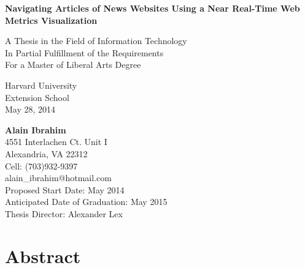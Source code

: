\documentclass[12pt]{article}
\begin{document}
\begin{titlepage}
    \begin{center}
        \vspace*{0.5cm}
        
        \begin{doublespace}        
        \textbf{\Large Navigating Articles of News Websites Using a Near Real-Time Web Metrics Visualization}
        \vfill


        A Thesis in the Field of Information Technology \\
        In Partial Fulfillment of the Requirements \\
        For a Master of Liberal Arts Degree
        
        \vspace{0.8cm}
        
        Harvard University \\
        Extension School \\
        May 28, 2014        
        
        \vspace{1.5cm}
        
        \textbf{Alain Ibrahim} \\
        4551 Interlachen Ct. Unit I \\
        Alexandria, VA 22312 \\
        Cell: (703)932-9397 \\
		alain\_ibrahim@hotmail.com \\   
        Proposed Start Date: May 2014 \\
        Anticipated Date of Graduation: May 2015 \\
        Thesis Director: Alexander Lex \\
		\end{doublespace}        
        
        \vfill
         
    \end{center}
\end{titlepage}

\tableofcontents

\vfill

\section{Abstract}
\end{document}
